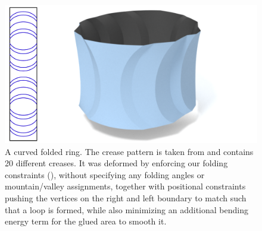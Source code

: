 \begin{figure} [t]
	\centering
	\includegraphics[width=0.65\linewidth]{figures/ring}
	\caption{A curved folded ring. The crease pattern is taken from \cite{mitani2019curved} and contains 20 different creases. It was deformed by enforcing our folding constraints (), without specifying any folding angles or mountain/valley assignments, together with positional constraints pushing the vertices on the right and left boundary to match such that a loop is formed, while also minimizing an additional bending energy term for the glued area to smooth it.}
	\label{fig:ring}
\end{figure}